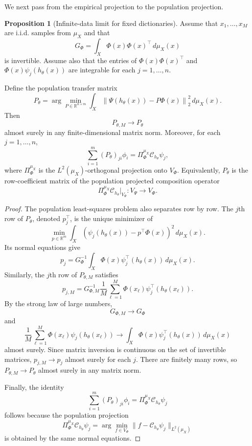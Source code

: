 \documentclass{article}
\theoremstyle{definition}
\newtheorem{proposition}{Proposition}
\begin{document}
We next pass from the empirical projection to the population projection.

\begin{proposition}[Infinite-data limit for fixed dictionaries]
\label{prop:infinite_data_transfer_projection}
Assume that $x_1,\ldots,x_M$ are i.i.d. samples from $\mu_X$ and that
\[
G_\Phi
=
\int_X \Phi(x)\Phi(x)^\top\,d\mu_X(x)
\]
is invertible. Assume also that the entries of $\Phi(x)\Phi(x)^\top$ and
$\Phi(x)\psi_j(h_\theta(x))$ are integrable for each $j=1,\ldots,n$.

Define the population transfer matrix
\begin{equation}
P_\theta
=
\arg\min_{P\in\mathbb R^{n\times m}}
\int_X
\left\|
\Psi(h_\theta(x))-P\Phi(x)
\right\|_2^2\,d\mu_X(x).
\label{eq:CSA_population_transfer}
\end{equation}
Then
\[
P_{\theta,M}\to P_\theta
\]
almost surely in any finite-dimensional matrix norm. Moreover, for each $j=1,\ldots,n$,
\[
\sum_{i=1}^m (P_\theta)_{ji}\phi_i
=
\Pi_\Phi^{\mu_X} \mathcal C_{h_\theta}\psi_j ,
\]
where $\Pi_\Phi^{\mu_X}$ is the $L^2(\mu_X)$-orthogonal projection onto $V_\Phi$.
Equivalently, $P_\theta$ is the row-coefficient matrix of the population projected
composition operator
\[
\Pi_\Phi^{\mu_X} \mathcal C_{h_\theta}\big|_{V_\Psi}:V_\Psi\to V_\Phi .
\]
\end{proposition}

\begin{proof}
The population least-squares problem also separates row by row. The $j$th row of
$P_\theta$, denoted $p_j^\top$, is the unique minimizer of
\[
\min_{p\in\mathbb R^m}
\int_X
\left(
\psi_j(h_\theta(x))-p^\top\Phi(x)
\right)^2
\,d\mu_X(x).
\]
Its normal equations give
\[
p_j
=
G_\Phi^{-1}
\int_X
\Phi(x)\psi_j^\top(h_\theta(x))\,d\mu_X(x).
\]
Similarly, the $j$th row of $P_{\theta,M}$ satisfies
\[
p_{j,M}
=
G_{\Phi,M}^{-1}
\frac1M\sum_{\ell=1}^M
\Phi(x_\ell)\psi_j^\top(h_\theta(x_\ell)).
\]
By the strong law of large numbers,
\[
G_{\Phi,M}\to G_\Phi
\]
and
\[
\frac1M\sum_{\ell=1}^M
\Phi(x_\ell)\psi_j(h_\theta(x_\ell))
\to
\int_X
\Phi(x)\psi_j^\top(h_\theta(x))\,d\mu_X(x)
\]
almost surely. Since matrix inversion is continuous on the set of invertible matrices,
$p_{j,M}\to p_j$ almost surely for each $j$. There are finitely many rows, so
$P_{\theta,M}\to P_\theta$ almost surely in any matrix norm.

Finally, the identity
\[
\sum_{i=1}^m (P_\theta)_{ji}\phi_i
=
\Pi_\Phi^{\mu_X} \mathcal C_{h_\theta}\psi_j
\]
follows because the population projection
\[
\Pi_\Phi^{\mu_X}\mathcal C_{h_\theta}\psi_j
=
\arg\min_{f\in V_\Phi}
\|f-\mathcal C_{h_\theta}\psi_j\|_{L^2(\mu_X)}
\]
is obtained by the same normal equations.
\end{proof}
\end{document}
